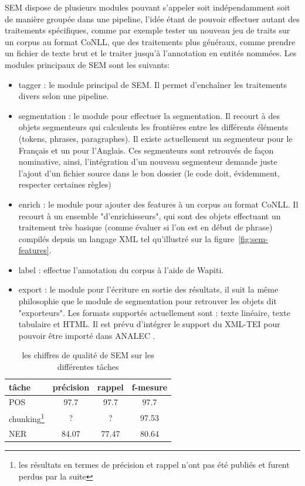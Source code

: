 \documentclass[citation\_needed]{subfiles}
\begin{document}
SEM dispose de plusieurs modules pouvant s'appeler soit indépendamment soit de manière groupée dans une pipeline, l'idée étant de pouvoir effectuer autant des traitements spécifiques, comme par exemple tester un nouveau jeu de traits sur un corpus au format CoNLL, que des traitements plus généraux, comme prendre un fichier de texte brut et le traiter jusqu'à l'annotation en entités nommées. Les modules principaux de SEM sont les suivants:
\begin{itemize}
    \item tagger : le module principal de SEM. Il permet d'enchaîner les traitements divers selon une pipeline.
    \item segmentation : le module pour effectuer la segmentation. Il recourt à des objets segmenteurs qui calculents les frontières entre les différents éléments (tokens, phrases, paragraphes). Il existe actuellement un segmenteur pour le Français et un pour l'Anglais. Ces segmenteurs sont retrouvés de façon nominative, ainsi, l'intégration d'un nouveau segmenteur demande juste l'ajout d'un fichier source dans le bon dossier (le code doit, évidemment, respecter certaines règles)
    \item enrich : le module pour ajouter des features à un corpus au format CoNLL. Il recourt à un ensemble "d'enrichisseurs", qui sont des objets effectuant un traitement très basique (comme évaluer si l'on est en début de phrase) compilés depuis un langage XML tel qu'illustré sur la figure\ \ref{fig:sem-features}.
    \item label : effectue l'annotation du corpus à l'aide de Wapiti.
    \item export : le module pour l'écriture en sortie des résultats, il suit la même philosophie que le module de segmentation pour retrouver les objets dit "exporteurs". Les formats supportés actuellement sont : texte linéaire, texte tabulaire et HTML. Il est prévu d'intégrer le support du XML-TEI pour pouvoir être importé dans ANALEC \citep{landragin2012analec}.
\end{itemize}

\begin{savenotes}
\begin{table}[ht!]
\centering
\begin{tabular}{|l|ccc|}
\hline
tâche    & précision & rappel & f-mesure \\
\hline
POS      & 97.7      & 97.7   & 97.7 \\
chunking\footnote{les résultats en termes de précision et rappel n'ont pas été publiés et furent perdus par la suite} & ?         & ?      & 97.53 \\
NER      & 84.07     & 77.47  & 80.64 \\
\hline
\end{tabular}
\caption{les chiffres de qualité de SEM sur les différentes tâches}
\end{table}
\end{savenotes}
\end{document}
